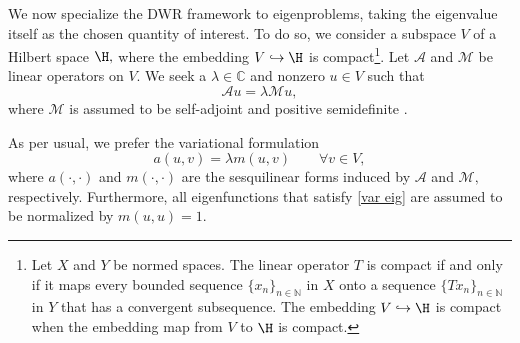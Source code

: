 


We now specialize the DWR framework to eigenproblems, taking the eigenvalue itself as the chosen quantity of interest.
To do so, we consider a subspace $V$ of a Hilbert space $\H,$ where the embedding $V  \hookrightarrow \H$ is compact\footnote{
Let $X$ and $Y$ be normed spaces. The linear operator $T$ is compact if and only if it maps every bounded sequence $\{x_n\}_{n \in \mathbb{N}}$ in $X$ onto a sequence  $\{Tx_n\}_{n \in \mathbb{N}}$ in $Y$ that has a convergent subsequence. The embedding $V  \hookrightarrow \H$ is compact when the embedding map from $V$ to $\H$ is compact.}. Let $\mathcal{A}$ and $\mathcal{M}$ be linear operators on $V.$
 We seek a  $\lambda \in \mathbb{C}$ and nonzero $u \in V$ such that 
\begin{equation} \label{eig prob}
    \mathcal{A}u = \lambda \mathcal{M} u,
\end{equation}
where $\mathcal{M}$ is assumed to be self-adjoint and positive semidefinite  \cite{Bangerth}. 


As per usual, we prefer the variational formulation
\begin{equation} \label{var eig}
    a(u, v) = \lambda m(u, v) \qquad \forall v \in V,
\end{equation}
where $a(\cdot, \cdot)$ and $m(\cdot, \cdot)$ are the sesquilinear forms induced by $\mathcal{A}$ and $\mathcal{M},$ respectively.
Furthermore, all eigenfunctions that satisfy \eqref{var eig} are assumed to be normalized by $m(u, u) = 1.$

